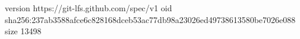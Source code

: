 version https://git-lfs.github.com/spec/v1
oid sha256:237ab3588afce6c828168dceb53ac77db98a23026ed49738613580be7026e088
size 13498
